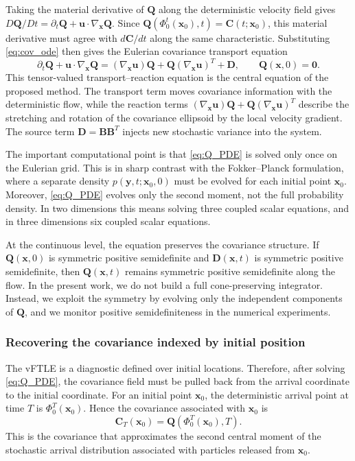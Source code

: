 \documentclass[a4paper,11pt]{article}
\numberwithin{equation}{section}
\theoremstyle{plain}
\theoremstyle{definition}
\theoremstyle{remark}
\newcommand{\bx}{\mathbf{x}}
\newcommand{\by}{\mathbf{y}}
\newcommand{\bu}{\mathbf{u}}
\newcommand{\bB}{\mathbf{B}}
\newcommand{\bC}{\mathbf{C}}
\newcommand{\bD}{\mathbf{D}}
\newcommand{\bQ}{\mathbf{Q}}
\newcommand{\bzero}{\mathbf{0}}
\newcommand{\flow}[2]{\Phi_{#1}^{#2}}
\begin{document}
Taking the material derivative of \(\bQ\) along the deterministic velocity field gives \(D\bQ/Dt=\partial_t\bQ+\bu\cdot\nabla_{\bx}\bQ\).  Since \(\bQ(\flow{0}{t}(\bx_0),t)=\bC(t;\bx_0)\), this material derivative must agree with \(d\bC/dt\) along the same characteristic.  Substituting \eqref{eq:cov_ode} then gives the Eulerian covariance transport equation
\begin{equation}
    \partial_t\bQ+\bu\cdot\nabla_{\bx}\bQ
    =
    (\nabla_{\bx}\bu)\bQ+\bQ(\nabla_{\bx}\bu)^T+\bD,
    \qquad
    \bQ(\bx,0)=\bzero .
    \label{eq:Q_PDE}
\end{equation}
This tensor-valued transport--reaction equation is the central equation of the proposed method.  The transport term moves covariance information with the deterministic flow, while the reaction terms \((\nabla_{\bx}\bu)\bQ+\bQ(\nabla_{\bx}\bu)^T\) describe the stretching and rotation of the covariance ellipsoid by the local velocity gradient.  The source term \(\bD=\bB\bB^T\) injects new stochastic variance into the system.

The important computational point is that \eqref{eq:Q_PDE} is solved only once on the Eulerian grid.  This is in sharp contrast with the Fokker--Planck formulation, where a separate density \(p(\by,t;\bx_0,0)\) must be evolved for each initial point \(\bx_0\).  Moreover, \eqref{eq:Q_PDE} evolves only the second moment, not the full probability density.  In two dimensions this means solving three coupled scalar equations, and in three dimensions six coupled scalar equations.

At the continuous level, the equation preserves the covariance structure.  If \(\bQ(\bx,0)\) is symmetric positive semidefinite and \(\bD(\bx,t)\) is symmetric positive semidefinite, then \(\bQ(\bx,t)\) remains symmetric positive semidefinite along the flow.  In the present work, we do not build a full cone-preserving integrator.  Instead, we exploit the symmetry by evolving only the independent components of \(\bQ\), and we monitor positive semidefiniteness in the numerical experiments.

\subsubsection{Recovering the covariance indexed by initial position}

The vFTLE is a diagnostic defined over initial locations.  Therefore, after solving \eqref{eq:Q_PDE}, the covariance field must be pulled back from the arrival coordinate to the initial coordinate.  For an initial point \(\bx_0\), the deterministic arrival point at time \(T\) is \(\flow{0}{T}(\bx_0)\).  Hence the covariance associated with \(\bx_0\) is
\begin{equation}
    \bC_T(\bx_0)=\bQ(\flow{0}{T}(\bx_0),T).
    \label{eq:initial_indexed_cov}
\end{equation}
This is the covariance that approximates the second central moment of the stochastic arrival distribution associated with particles released from \(\bx_0\).
\end{document}
